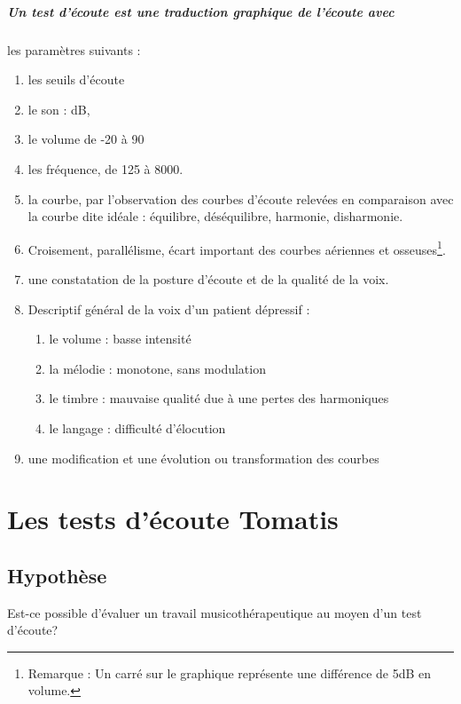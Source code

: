   \subparagraph{Un test d'écoute est une traduction graphique de l'écoute avec}
  
  les paramètres suivants : 
  \begin{enumerate}
  \item les seuils d'écoute
  \item le son : dB, 
  \item le volume de -20 à 90
  \item les fréquence, de 125 à 8000.   \label{chapitre 6.2t} %
  \item la courbe, par l'observation des courbes d'écoute relevées
    en comparaison avec la courbe dite idéale : équilibre,
    déséquilibre, harmonie, disharmonie.  
  \item Croisement, parallélisme,
      écart important des courbes aériennes et osseuses\footnote{Remarque :
      Un carré sur le graphique représente une différence de 5dB en
      volume.}.
    \item une constatation de la posture d'écoute et de la qualité de
      la voix.
    
    \item Descriptif général de la voix d'un patient dépressif :
      \begin{enumerate}
        \item le volume : basse intensité
        \item la mélodie : monotone, sans modulation
        \item le timbre : mauvaise qualité due à une pertes des harmoniques
        \item le langage : difficulté d'élocution
          \end{enumerate}
    \item une modification et une évolution ou transformation des courbes
  \end{enumerate}

\section{Les tests d'écoute Tomatis}

\subsection{Hypothèse}

Est-ce possible d'évaluer un travail musicothérapeutique au moyen
d'un test d'écoute?

